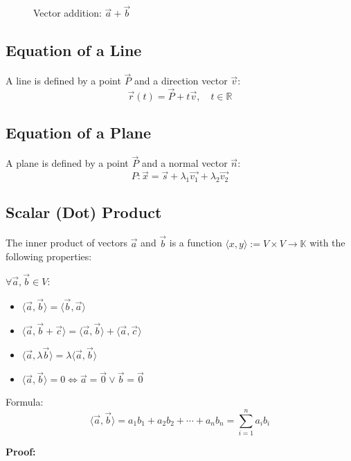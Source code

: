 \begin{figure}[h!]
	\centering
	\caption{Vector addition: \(\vec{a} + \vec{b}\)}
\end{figure}

\subsection{Equation of a Line}
A line is defined by a point \(\vec{P}\) and a direction vector \(\vec{v}\):
\[
	\vec{r}(t) = \vec{P} + t\vec{v}, \quad t \in \mathbb{R}
\]

\subsection{Equation of a Plane}
A plane is defined by a point \(\vec{P}\) and a normal vector \(\vec{n}\):
\[
	P: \vec{x} = \vec{s} + \lambda_1 \vec{v_1} + \lambda_2 \vec{v_2}
\]
\subsection{Scalar (Dot) Product}
The inner product of vectors \(\vec{a}\) and \(\vec{b}\) is a function \(\langle x, y\rangle :=V \times V \rightarrow \mathbb{K}\)
with the following properties:

\(\forall \vec{a}, \vec{b} \in V\):
\begin{itemize}[label=\(-\)]
	\item \(\langle\vec{a}, \vec{b}\rangle = \langle\vec{b}, \vec{a}\rangle \)
	\item \(\langle\vec{a}, \vec{b} + \vec{c}\rangle = \langle\vec{a}, \vec{b}\rangle + \langle\vec{a}, \vec{c}\rangle\)
	\item \(\langle\vec{a}, \lambda \vec{b}\rangle = \lambda \langle\vec{a}, \vec{b}\rangle\)
	\item \(\langle\vec{a}, \vec{b}\rangle = 0 \Leftrightarrow \vec{a} = \vec{0} \vee \vec{b} = \vec{0}\)
\end{itemize}

 Formula:
\[
	\langle\vec{a}, \vec{b}\rangle = a_1 b_1 + a_2 b_2 + \cdots + a_n b_n = \sum_{i = 1}^{n} a_i b_i
\]

\textbf{Proof:}

